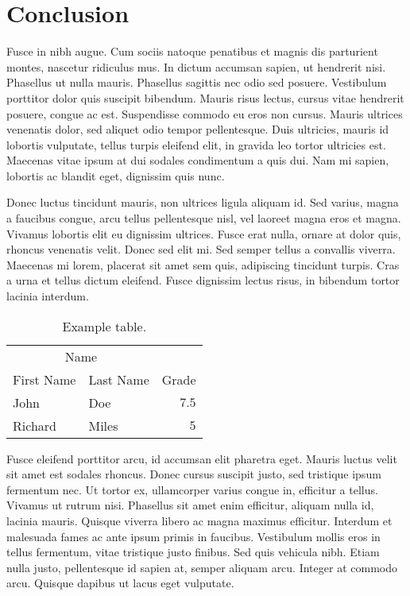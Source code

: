 \documentclass[11pt]{diazessay} %
\begin{document}

\section*{Conclusion}

Fusce in nibh augue. Cum sociis natoque penatibus et magnis dis parturient montes, nascetur ridiculus mus. In dictum accumsan sapien, ut hendrerit nisi. Phasellus ut nulla mauris. Phasellus sagittis nec odio sed posuere. Vestibulum porttitor dolor quis suscipit bibendum. Mauris risus lectus, cursus vitae hendrerit posuere, congue ac est. Suspendisse commodo eu eros non cursus. Mauris ultrices venenatis dolor, sed aliquet odio tempor pellentesque. Duis ultricies, mauris id lobortis vulputate, tellus turpis eleifend elit, in gravida leo tortor ultricies est. Maecenas vitae ipsum at dui sodales condimentum a quis dui. Nam mi sapien, lobortis ac blandit eget, dignissim quis nunc.

Donec luctus tincidunt mauris, non ultrices ligula aliquam id. Sed varius, magna a faucibus congue, arcu tellus pellentesque nisl, vel laoreet magna eros et magna. Vivamus lobortis elit eu dignissim ultrices. Fusce erat nulla, ornare at dolor quis, rhoncus venenatis velit. Donec sed elit mi. Sed semper tellus a convallis viverra. Maecenas mi lorem, placerat sit amet sem quis, adipiscing tincidunt turpis. Cras a urna et tellus dictum eleifend. Fusce dignissim lectus risus, in bibendum tortor lacinia interdum.

\begin{table}[h] %
	\caption{Example table.}
	\centering
	\begin{tabular}{l l r}
		\toprule
		\multicolumn{2}{c}{Name} \\
		\cmidrule(r){1-2}
		First Name & Last Name & Grade \\
		\midrule
		John & Doe & $7.5$ \\
		Richard & Miles & $5$ \\
		\bottomrule
	\end{tabular}
\end{table}

Fusce eleifend porttitor arcu, id accumsan elit pharetra eget. Mauris luctus velit sit amet est sodales rhoncus. Donec cursus suscipit justo, sed tristique ipsum fermentum nec. Ut tortor ex, ullamcorper varius congue in, efficitur a tellus. Vivamus ut rutrum nisi. Phasellus sit amet enim efficitur, aliquam nulla id, lacinia mauris. Quisque viverra libero ac magna maximus efficitur. Interdum et malesuada fames ac ante ipsum primis in faucibus. Vestibulum mollis eros in tellus fermentum, vitae tristique justo finibus. Sed quis vehicula nibh. Etiam nulla justo, pellentesque id sapien at, semper aliquam arcu. Integer at commodo arcu. Quisque dapibus ut lacus eget vulputate.
\end{document}
